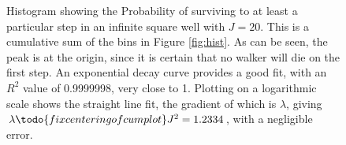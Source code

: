 \documentclass[journal]{IEEEtran}
\begin{document}
\begin{figure}%
  \centering
  \centering
  \caption{Histogram showing the Probability of surviving to at least a
      particular step in an infinite square well with $J = 20$. This is a
      cumulative sum of the bins in Figure \ref{fig:hist}. As can be seen, the
      peak is at the origin, since it is certain that no walker will die on the
      first step. An exponential decay curve provides a good fit, with an $R^2$
      value of 0.9999998, very close to 1. Plotting on a logarithmic scale shows
      the straight line fit, the gradient of which is $\lambda$, giving $\lambda
\todo{fix centering of cum plot}
      J^2 = 1.2334$, with a negligible error.}
  \label{fig:cumplots}
\end{figure}
\end{document}
